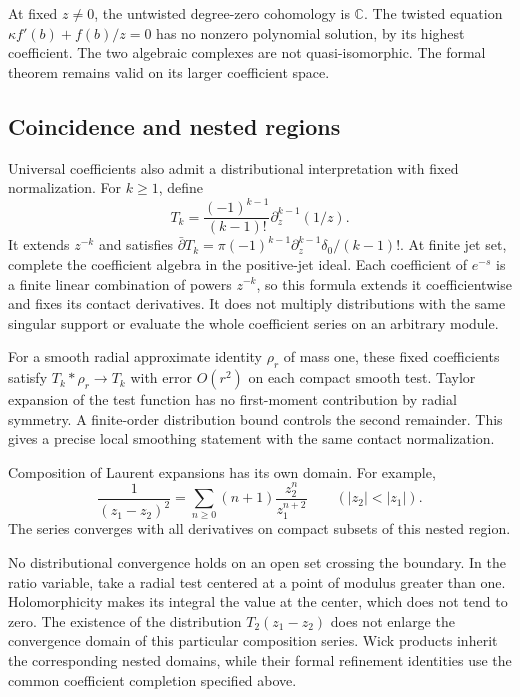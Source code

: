 At fixed \(z\ne0\), the untwisted degree-zero cohomology is \(\mathbb C\).
The twisted equation \(\kappa f'(b)+f(b)/z=0\) has no nonzero polynomial
solution, by its highest coefficient. The two algebraic complexes are not
quasi-isomorphic. The formal theorem remains valid on its larger coefficient
space.

\subsection{Coincidence and nested regions}

Universal coefficients also admit a distributional interpretation with fixed
normalization. For \(k\ge1\), define
\[
 T_k=\frac{(-1)^{k-1}}{(k-1)!}
                   \partial_z^{k-1}(1/z).
\]
It extends \(z^{-k}\) and satisfies \(\bar\partial T_k=
\pi(-1)^{k-1}\partial_z^{k-1}\delta_0/(k-1)!\). At finite jet set, complete
the coefficient algebra in the positive-jet ideal. Each coefficient of
\(e^{-s}\) is a finite linear combination of powers \(z^{-k}\), so this
formula extends it coefficientwise and fixes its contact derivatives. It
does not multiply distributions with the same singular support or evaluate
the whole coefficient series on an arbitrary module.

For a smooth radial approximate identity \(\rho_r\) of mass one, these fixed
coefficients satisfy \(T_k*\rho_r\to T_k\) with error \(O(r^2)\) on each
compact smooth test. Taylor expansion of the test function has no
first-moment contribution by radial symmetry. A finite-order distribution
bound controls the second remainder. This gives a precise local smoothing
statement with the same contact normalization.

Composition of Laurent expansions has its own domain. For example,
\[
 \frac1{(z_1-z_2)^2}
  =\sum_{n\ge0}(n+1)\frac{z_2^n}{z_1^{n+2}}
       \qquad (|z_2|<|z_1|).
\]
The series converges with all derivatives on compact subsets of this nested
region.

No distributional convergence holds on an open set crossing the boundary. In
the ratio variable, take a radial test centered at a point of modulus
greater than one. Holomorphicity makes its integral the value at the center,
which does not tend to zero. The existence of the distribution
\(T_2(z_1-z_2)\) does not enlarge the convergence domain of this particular
composition series. Wick products inherit the corresponding nested domains,
while their formal refinement identities use the common coefficient
completion specified above.


